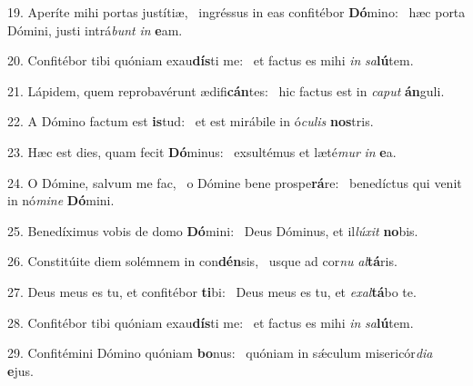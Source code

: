 19. Aperíte mihi portas justítiæ, \dag\  ingréssus in eas confitébor \textbf{Dó}mino: \ast\  hæc porta Dómini, justi intrá\textit{bunt} \textit{in} \textbf{e}am.\

20. Confitébor tibi quóniam exau\textbf{dís}ti me: \ast\  et factus es mihi \textit{in} \textit{sa}\textbf{lú}tem.\

21. Lápidem, quem reprobavérunt ædifi\textbf{cán}tes: \ast\  hic factus est in \textit{ca}\textit{put} \textbf{án}guli.\

22. A Dómino factum est \textbf{is}tud: \ast\  et est mirábile in ó\textit{cu}\textit{lis} \textbf{nos}tris.\

23. Hæc est dies, quam fecit \textbf{Dó}minus: \ast\  exsultémus et læté\textit{mur} \textit{in} \textbf{e}a.\

24. O Dómine, salvum me fac, \dag\  o Dómine bene prospe\textbf{rá}re: \ast\  benedíctus qui venit in nó\textit{mi}\textit{ne} \textbf{Dó}mini.\

25. Benedíximus vobis de domo \textbf{Dó}mini: \ast\  Deus Dóminus, et il\textit{lú}\textit{xit} \textbf{no}bis.\

26. Constitúite diem solémnem in con\textbf{dén}sis, \ast\  usque ad cor\textit{nu} \textit{al}\textbf{tá}ris.\

27. Deus meus es tu, et confitébor \textbf{ti}bi: \ast\  Deus meus es tu, et \textit{ex}\textit{al}\textbf{tá}bo te.\

28. Confitébor tibi quóniam exau\textbf{dís}ti me: \ast\  et factus es mihi \textit{in} \textit{sa}\textbf{lú}tem.\

29. Confitémini Dómino quóniam \textbf{bo}nus: \ast\  quóniam in sǽculum misericór\textit{di}\textit{a} \textbf{e}jus.\

